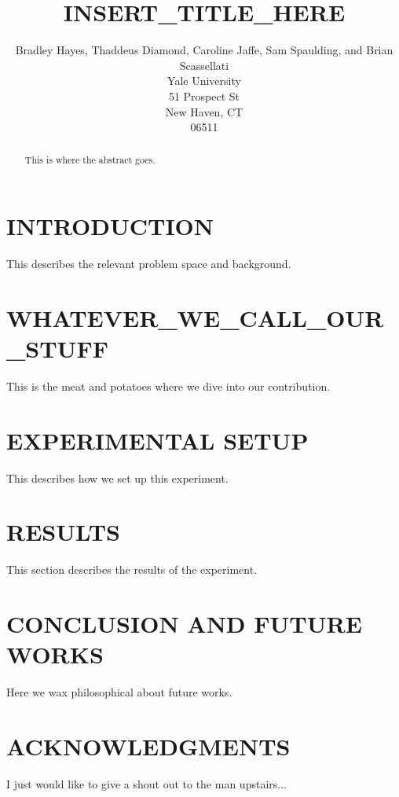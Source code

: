 \documentclass[letterpaper, 10 pt, conference]{ieeeconf}
\title{\LARGE \bf
INSERT\_TITLE\_HERE
}
\author{Bradley Hayes, Thaddeus Diamond, Caroline Jaffe, Sam Spaulding, and Brian Scassellati\\
Yale University\\
51 Prospect St\\
New Haven, CT\\
06511\\
}
\begin{document}
\maketitle
\thispagestyle{empty}
\pagestyle{empty}

\begin{abstract}
This is where the abstract goes.
\end{abstract}

\section{INTRODUCTION}
\label{sec:intro}
This describes the relevant problem space\cite{LFDSurvey} and background.

\section{WHATEVER\_WE\_CALL\_OUR\_STUFF}
\label{sec:body}
This is the meat and potatoes where we dive into our contribution.

\section{EXPERIMENTAL SETUP}
\label{sec:setup}
This describes how we set up this experiment.

\section{RESULTS}
\label{sec:results}
This section describes the results of the experiment.

\section{CONCLUSION AND FUTURE WORKS}
\label{sec:conclude}
Here we wax philosophical about future works.

\section{ACKNOWLEDGMENTS}
\label{sec:ack}
I just would like to give a shout out to the man upstairs...



\end{document}
